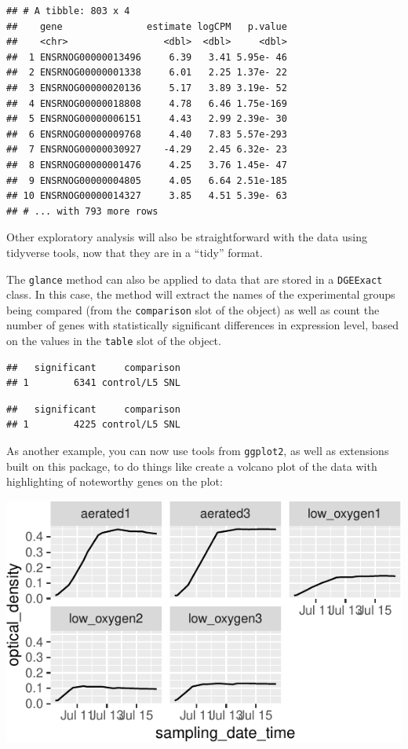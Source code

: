 \documentclass[]{tufte-book}
\begin{document}
\begin{verbatim}
## # A tibble: 803 x 4
##    gene               estimate logCPM   p.value
##    <chr>                 <dbl>  <dbl>     <dbl>
##  1 ENSRNOG00000013496     6.39   3.41 5.95e- 46
##  2 ENSRNOG00000001338     6.01   2.25 1.37e- 22
##  3 ENSRNOG00000020136     5.17   3.89 3.19e- 52
##  4 ENSRNOG00000018808     4.78   6.46 1.75e-169
##  5 ENSRNOG00000006151     4.43   2.99 2.39e- 30
##  6 ENSRNOG00000009768     4.40   7.83 5.57e-293
##  7 ENSRNOG00000030927    -4.29   2.45 6.32e- 23
##  8 ENSRNOG00000001476     4.25   3.76 1.45e- 47
##  9 ENSRNOG00000004805     4.05   6.64 2.51e-185
## 10 ENSRNOG00000014327     3.85   4.51 5.39e- 63
## # ... with 793 more rows
\end{verbatim}

Other exploratory analysis will also be straightforward with the data
using tidyverse tools, now that they are in a ``tidy'' format.

The \texttt{glance} method can also be applied to data that are stored in a
\texttt{DGEExact} class. In this case, the method will extract the names of the
experimental groups being compared (from the \texttt{comparison} slot of the
object) as well as count the number of genes with statistically
significant differences in expression level, based on the values in the
\texttt{table} slot of the object.

\begin{verbatim}
##   significant     comparison
## 1        6341 control/L5 SNL
\end{verbatim}

\begin{verbatim}
##   significant     comparison
## 1        4225 control/L5 SNL
\end{verbatim}

As another example, you can now use tools from \texttt{ggplot2}, as well as
extensions built on this package, to do things like create a volcano
plot of the data with highlighting of noteworthy genes on the plot:

\includegraphics{improve_repro_files/figure-latex/unnamed-chunk-34-1}
\end{document}
